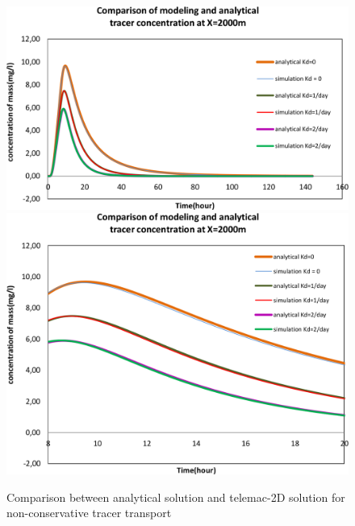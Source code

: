 \begin{figure}
\centering
\includegraphics[width=.6\textwidth]{img/sol_anal}
\includegraphics[width=.6\textwidth]{img/sol_anal_zoomed}
\caption{Comparison between analytical solution and telemac-2D solution for non-conservative tracer transport}\label{fig:tracer_decay:sol_anal}
\end{figure}

